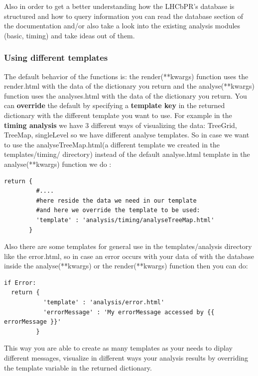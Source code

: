 \documentclass{lhcbnote}
\begin{document}
\vspace{2 mm}

Also in order to get a better understanding how the LHCbPR's database is structured and how to query information you can read the database section of the documentation and/or also take a look into the existing analysis modules (basic, timing) and take ideas out of them.

\subsubsection{Using different templates}

The default behavior of the functions is: the render(**kwargs) function uses the render.html with the data of the dictionary you return 
and the analyse(**kwargs) function uses the analyses.html with the data of the dictionary you return. You can {\bf override} the default by specifying
a {\bf template key} in the returned dictionary with the different template you want to use. For example in the {\bf timing analysis} we have 3 different ways of visualizing the data:
TreeGrid, TreeMap, singleLevel so we have different analyse templates. So in case we want to use the analyseTreeMap.html(a different template we created in the templates/timing/  directory)  instead
of the default analyse.html template  in the analyse(**kwargs) function we do :

\begin{verbatim}
return {
         #....            
         #here reside the data we need in our template
         #and here we override the template to be used:
         'template' : 'analysis/timing/analyseTreeMap.html'
       }
\end{verbatim}

Also there are some templates for general use  in the templates/analysis directory like the error.html, so in case an error occurs with your data of with the database inside the analyse(**kwargs) or the render(**kwargs) function
then you can do:

\begin{verbatim}
if Error:
  return {
           'template' : 'analysis/error.html'
           'errorMessage' : 'My errorMessage accessed by {{ errorMessage }}'
         } 
\end{verbatim}

This way you are able to create as many templates as your needs to diplay different messages, visualize in different ways your analysis results 
by overriding the template variable in the returned dictionary.
\end{document}
